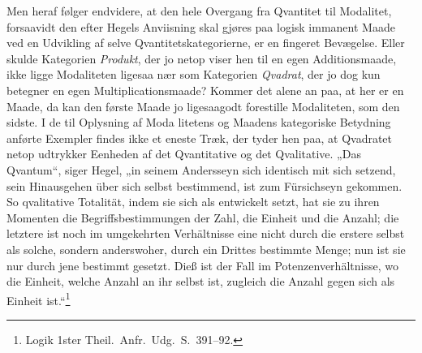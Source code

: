 \documentclass[12pt]{book}
\newcommand{\opage}[1]{\marginnote{\footnotesize\textit{[#1]}}}
\begin{document}
Men heraf følger endvidere, at den hele Overgang fra Qvantitet til Modalitet, forsaavidt den efter
Hegels Anviisning skal gjøres paa logisk immanent Maade ved en Udvikling af selve
Qvantitetskategorierne, er en fingeret Bevægelse. Eller skulde Kategorien \emph{Produkt}, der jo netop
viser hen til en egen Additionsmaade, ikke ligge Modaliteten ligesaa nær som Kategorien \emph{Qvadrat},
der jo dog kun betegner en egen Multiplicationsmaade? Kommer det alene an paa, at her er en Maade, da
kan den første Maade jo ligesaagodt forestille Modaliteten, som den sidste. I de til Oplysning af Moda%
\opage{304} litetens og Maadens kategoriske Betydning anførte Exempler findes ikke et eneste Træk, der tyder hen
paa, at Qvadratet netop udtrykker Eenheden af det Qvantitative og det Qvalitative. „Das Qvantum“, siger
Hegel, „in seinem Andersseyn sich identisch mit sich setzend, sein Hinausgehen über sich selbst
bestimmend, ist zum Fürsichseyn gekommen. So qvalitative Totalität, indem sie sich als entwickelt setzt,
hat sie zu ihren Momenten die Begriffsbestimmungen der Zahl, die Einheit und die Anzahl; die letztere
ist noch im umgekehrten Verhältnisse eine nicht durch die erstere selbst als solche, sondern
anderswoher, durch ein Drittes bestimmte Menge; nun ist sie nur durch jene bestimmt gesetzt. Dieß ist
der Fall im Potenzenverhältnisse, wo die Einheit, welche Anzahl an ihr selbst ist, zugleich die Anzahl
gegen sich als Einheit ist.“\footnote{Logik 1ster Theil.\ Anfr.\ Udg.\ S.~391--92.}
\end{document}
